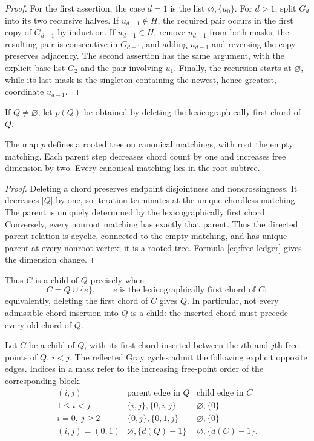 \documentclass[12pt]{article}
\begin{document}
\begin{proof}
For the first assertion, the case $d=1$ is the list
$\varnothing,\{u_0\}$.  For $d>1$, split $G_d$ into its two recursive halves.
If $u_{d-1}\notin H$, the required pair occurs in the first copy of
$G_{d-1}$ by induction.  If $u_{d-1}\in H$, remove $u_{d-1}$ from both masks;
the resulting pair is consecutive in $G_{d-1}$, and adding $u_{d-1}$ and
reversing the copy preserves adjacency.  The second assertion has the same
argument, with the explicit base list $G_2$ and the pair involving $u_1$.
Finally, the recursion starts at $\varnothing$, while its last mask is the
singleton containing the newest, hence greatest, coordinate $u_{d-1}$.
\end{proof}

If $Q\neq\varnothing$, let $p(Q)$ be obtained by deleting the
lexicographically first chord of $Q$.

\begin{lemma}\label{lem:canonical-block-tree}
The map $p$ defines a rooted tree on canonical matchings, with root the empty
matching.  Each parent step decreases chord count by one and increases free
dimension by two.  Every canonical matching lies in the root subtree.
\end{lemma}

\begin{proof}
Deleting a chord preserves endpoint disjointness and noncrossingness.
It decreases $|Q|$ by one, so iteration terminates at the unique chordless
matching.  The parent is uniquely determined by the lexicographically first
chord.  Conversely, every nonroot matching has exactly that parent.  Thus the
directed parent relation is acyclic, connected to the empty matching, and has
unique parent at every nonroot vertex; it is a rooted tree.  Formula
\eqref{eq:free-ledger} gives the dimension change.
\end{proof}

Thus $C$ is a child of $Q$ precisely when
\[
 C=Q\cup\{e\},
 \qquad e\text{ is the lexicographically first chord of }C;
\]
equivalently, deleting the first chord of $C$ gives $Q$.  In particular, not
every admissible chord insertion into $Q$ is a child: the inserted chord must
precede every old chord of $Q$.

Let $C$ be a child of $Q$, with its first chord inserted between the $i$th and
$j$th free points of $Q$, $i<j$.  The reflected Gray cycles admit the
following explicit opposite edges.  Indices in a mask refer to the increasing
free-point order of the corresponding block.
\begin{equation}\label{eq:ports}
\begin{array}{c|c|c}
 (i,j)&\text{parent edge in }Q&\text{child edge in }C\\ \hline
 1\leq i<j&\{i,j\},\{0,i,j\}&\varnothing,\{0\}\\
 i=0,\ j\geq2&\{0,j\},\{0,1,j\}&\varnothing,\{0\}\\
 (i,j)=(0,1)&\varnothing,\{d(Q)-1\}&
      \varnothing,\{d(C)-1\}.
\end{array}
\end{equation}
\end{document}
